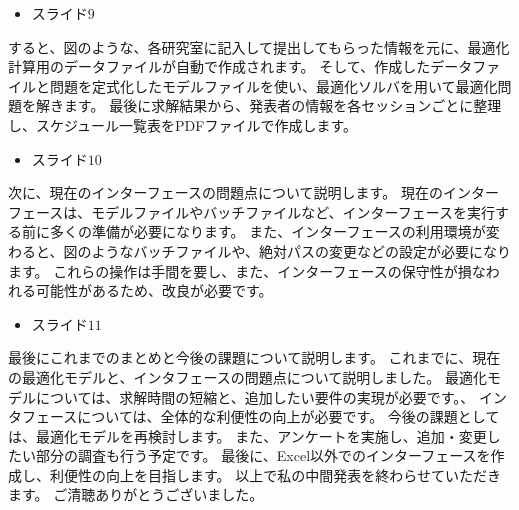 \documentclass[a4j]{jarticle}
\begin{document}
\begin{itemize}
\item スライド$9$
\end{itemize}
すると、図のような、各研究室に記入して提出してもらった情報を元に、最適化計算用のデータファイルが自動で作成されます。
そして、作成したデータファイルと問題を定式化したモデルファイルを使い、最適化ソルバを用いて最適化問題を解きます。
最後に求解結果から、発表者の情報を各セッションごとに整理し、スケジュール一覧表をPDFファイルで作成します。
%

\begin{itemize}
\item スライド$10$
\end{itemize}
次に、現在のインターフェースの問題点について説明します。
現在のインターフェースは、モデルファイルやバッチファイルなど、インターフェースを実行する前に多くの準備が必要になります。
また、インターフェースの利用環境が変わると、図のようなバッチファイルや、絶対パスの変更などの設定が必要になります。
これらの操作は手間を要し、また、インターフェースの保守性が損なわれる可能性があるため、改良が必要です。
%


\begin{itemize}
\item スライド$11$
\end{itemize}
最後にこれまでのまとめと今後の課題について説明します。
これまでに、現在の最適化モデルと、インタフェースの問題点について説明しました。
最適化モデルについては、求解時間の短縮と、追加したい要件の実現が必要です。、
インタフェースについては、全体的な利便性の向上が必要です。
今後の課題としては、最適化モデルを再検討します。
また、アンケートを実施し、追加・変更したい部分の調査も行う予定です。
最後に、Excel以外でのインターフェースを作成し、利便性の向上を目指します。
以上で私の中間発表を終わらせていただきます。
ご清聴ありがとうございました。
%
\end{document}
